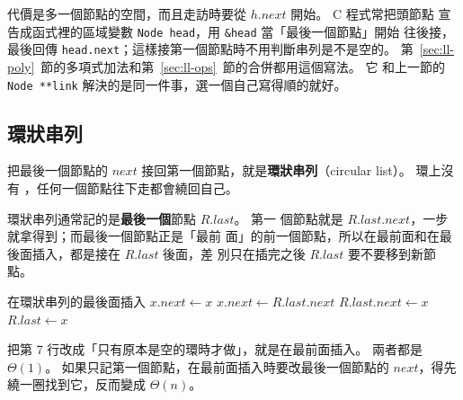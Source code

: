 \begin{center}
\label{fig:ll-header}
\end{center}

代價是多一個節點的空間，而且走訪時要從 $h.\mathit{next}$ 開始。 C 程式常把頭節點
宣告成函式裡的區域變數 \texttt{Node head}，用 \texttt{\&head} 當「最後一個節點」開始
往後接，最後回傳 \texttt{head.next}；這樣接第一個節點時不用判斷串列是不是空的。
第~\ref{sec:ll-poly}~節的多項式加法和第~\ref{sec:ll-ops}~節的合併都用這個寫法。 它
和上一節的 \texttt{Node **link} 解決的是同一件事，選一個自己寫得順的就好。

\subsection{環狀串列}

把最後一個節點的 $\mathit{next}$ 接回第一個節點，就是\textbf{環狀串列}（circular
list）。 環上沒有 \NIL，任何一個節點往下走都會繞回自己。

環狀串列通常記的是\textbf{最後一個}節點 $R.\mathit{last}$。 第一
個節點就是 $R.\mathit{last}.\mathit{next}$，一步就拿得到；而最後一個節點正是「最前
面」的前一個節點，所以在最前面和在最後面插入，都是接在 $R.\mathit{last}$ 後面，差
別只在插完之後 $R.\mathit{last}$ 要不要移到新節點。

\begin{pseudo}[label=alg:ll-ring-push]{在環狀串列的最後面插入}
     
        \State $x.\mathit{next} \gets x$
    \Else
        \State $x.\mathit{next} \gets R.\mathit{last}.\mathit{next}$
        \State $R.\mathit{last}.\mathit{next} \gets x$
    \EndIf
    \State $R.\mathit{last} \gets x$
\EndProcedure
\end{pseudo}

把第 7 行改成「只有原本是空的環時才做」，就是在最前面插入。 兩者都是
$\Theta(1)$。 如果只記第一個節點，在最前面插入時要改最後一個節點的
$\mathit{next}$，得先繞一圈找到它，反而變成 $\Theta(n)$。

